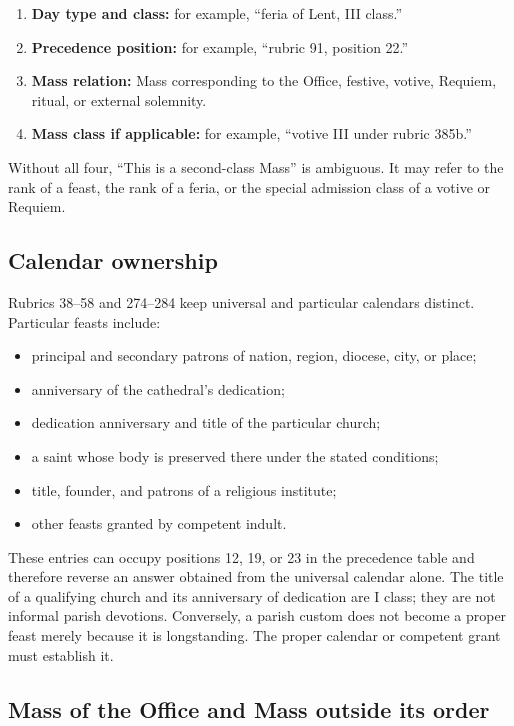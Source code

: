 \begin{enumerate}[leftmargin=1.45em]
\item \textbf{Day type and class:} for example, “feria of Lent, III class.”
\item \textbf{Precedence position:} for example, “rubric 91, position 22.”
\item \textbf{Mass relation:} Mass corresponding to the Office, festive, votive, Requiem, ritual, or external solemnity.
\item \textbf{Mass class if applicable:} for example, “votive III under rubric 385b.”
\end{enumerate}

Without all four, “This is a second-class Mass” is ambiguous. It may refer to the rank of a feast, the rank of a feria, or the special admission class of a votive or Requiem.

\subsection{Calendar ownership}

Rubrics 38--58 and 274--284 keep universal and particular calendars distinct. Particular feasts include:

\begin{itemize}
\item principal and secondary patrons of nation, region, diocese, city, or place;
\item anniversary of the cathedral's dedication;
\item dedication anniversary and title of the particular church;
\item a saint whose body is preserved there under the stated conditions;
\item title, founder, and patrons of a religious institute;
\item other feasts granted by competent indult.
\end{itemize}

These entries can occupy positions 12, 19, or 23 in the precedence table and therefore reverse an answer obtained from the universal calendar alone. The title of a qualifying church and its anniversary of dedication are I class; they are not informal parish devotions. Conversely, a parish custom does not become a proper feast merely because it is longstanding. The proper calendar or competent grant must establish it.

\subsection{Mass of the Office and Mass outside its order}

